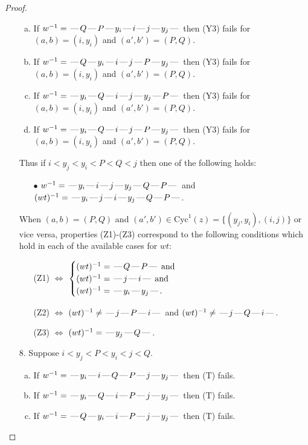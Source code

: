 \documentclass[10pt]{article}
\theoremstyle{definition}
\theoremstyle{definition}
\def\dash{\text{\hspace{0.5mm}---\hspace{0.5mm}}}
\def\Cyc{\mathrm{Cyc}}
\begin{document}
\begin{proof}
\begin{enumerate}
\begin{enumerate}[(a)]
\item If $w^{-1} = \dash Q\dash P\dash y_i\dash i\dash j\dash y_j\dash $ then (Y3) fails for $(a,b)=(i,y_i)$ and $(a',b')=(P,Q)$.
\item If $w^{-1} = \dash Q\dash y_i\dash i\dash j\dash P\dash y_j\dash $ then (Y3) fails for $(a,b)=(i,y_i)$ and $(a',b')=(P,Q)$.
\item If $w^{-1} = \dash y_i\dash Q\dash i\dash j\dash y_j\dash P\dash $ then (Y3) fails for $(a,b)=(i,y_i)$ and $(a',b')=(P,Q)$.
\item If $w^{-1} = \dash y_i\dash Q\dash i\dash j\dash P\dash y_j\dash $ then (Y3) fails for $(a,b)=(i,y_i)$ and $(a',b')=(P,Q)$.
\end{enumerate}
Thus if $i < y_j < y_i < P < Q < j$ then one of the following holds:
\begin{enumerate}
\item[$\bullet$] $w^{-1} = \dash y_i\dash i\dash j\dash y_j\dash Q\dash P\dash $ and $(wt)^{-1} = \dash y_i\dash j\dash i\dash y_j\dash Q\dash P\dash $.
\end{enumerate}
When $(a,b)= (P,Q)$ and $(a',b')\in \Cyc^1(z)=\{(y_j,y_i),(i,j)\}$ or vice versa,
properties (Z1)-(Z3) correspond to the following conditions which
hold in each of the available cases for $wt$:
\begin{enumerate}
\item[](Z1) $\Leftrightarrow$ $\begin{cases}\text{$(wt)^{-1} = \dash Q \dash P \dash$}\text{ and }\\
\text{$(wt)^{-1} = \dash j \dash i \dash$}\text{ and }\\
\text{$(wt)^{-1} = \dash y_i \dash y_j \dash$}.\end{cases}$
\item[](Z2) $\Leftrightarrow$ $(wt)^{-1} \neq \dash j \dash P \dash i \dash$ and $(wt)^{-1}\neq \dash j \dash Q \dash i \dash$.
\item[](Z3) $\Leftrightarrow$ $(wt)^{-1} = \dash y_j \dash Q \dash$.
\end{enumerate}
\item[$8$.] Suppose $i < y_j < P < y_i < j < Q$.
\begin{enumerate}[(a)]
\item If $w^{-1} = \dash y_i\dash i\dash Q\dash P\dash j\dash y_j\dash $ then (T) fails.
\item If $w^{-1} = \dash y_i\dash Q\dash i\dash P\dash j\dash y_j\dash $ then (T) fails.
\item If $w^{-1} = \dash Q\dash y_i\dash i\dash P\dash j\dash y_j\dash $ then (T) fails.

\end{enumerate}
\end{enumerate}
\end{proof}
\end{document}
